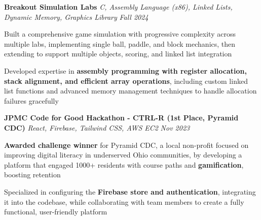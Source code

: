 \documentclass[letterpaper]{article}
\begin{document}
    {\textbf{Breakout Simulation Labs}} {\sl C, Assembly Language (x86), Linked Lists, Dynamic Memory, Graphics Library} \hfill \textsl{Fall 2024}\\
    \vspace{-2mm}
    \begin{tightitemize} \itemsep -1mm
    
        \item Built a comprehensive game simulation with progressive complexity across multiple labs, implementing single ball, paddle, and block mechanics, then extending to support multiple objects, scoring, and linked list integration

        \item Developed expertise in \textbf{assembly programming with register allocation, stack alignment, and efficient array operations}, including custom linked list functions and advanced memory management techniques to handle allocation failures gracefully

    \end{tightitemize}
    \vspace{-2mm}

    {\textbf{JPMC Code for Good Hackathon - CTRL-R (1st Place, Pyramid CDC)}} {\sl React, Firebase, Tailwind CSS, AWS EC2} \hfill \textsl{Nov 2023}\\
    \vspace{-2mm}
    \begin{tightitemize} \itemsep -1mm
    
        \item \textbf{Awarded challenge winner} for Pyramid CDC, a local non-profit focused on improving digital literacy in underserved Ohio communities, by developing a platform that engaged 1000+ residents with course paths and \textbf{gamification}, boosting retention

        \item Specialized in configuring the \textbf{Firebase store and authentication}, integrating it into the codebase, while collaborating with team members to create a fully functional, user-friendly platform

    \end{tightitemize}
    \vspace{-2mm}
\end{document}
